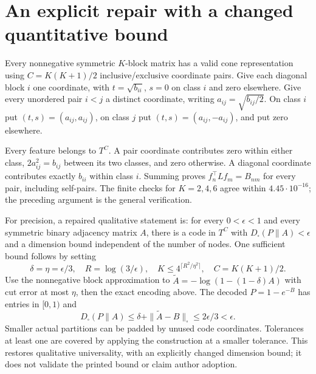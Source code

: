 \documentclass[10pt]{article}
\begin{document}
\section*{An explicit repair with a changed quantitative bound}
Every nonnegative symmetric \(K\)-block matrix has a valid cone representation using \(C=K(K+1)/2\) inclusive/exclusive coordinate pairs. Give each diagonal block \(i\) one coordinate, with \(t=\sqrt{b_{ii}}\), \(s=0\) on class \(i\) and zero elsewhere. Give every unordered pair \(i<j\) a distinct coordinate, writing \(a_{ij}=\sqrt{b_{ij}/2}\). On class \(i\) put \((t,s)=(a_{ij},a_{ij})\), on class \(j\) put \((t,s)=(a_{ij},-a_{ij})\), and put zero elsewhere.\par
Every feature belongs to \(T^C\). A pair coordinate contributes zero within either class, \(2a_{ij}^2=b_{ij}\) between its two classes, and zero otherwise. A diagonal coordinate contributes exactly \(b_{ii}\) within class \(i\). Summing proves \(f_n^\top Lf_m=B_{nm}\) for every pair, including self-pairs. The finite checks for \(K=2,4,6\) agree within \(4.45\cdot10^{-16}\); the preceding argument is the general verification.\par
For precision, a repaired qualitative statement is: for every \(0<\epsilon<1\) and every symmetric binary adjacency matrix \(A\), there is a code in \(T^C\) with \(D_\square(P\|A)<\epsilon\) and a dimension bound independent of the number of nodes. One sufficient bound follows by setting \[\delta=\eta=\epsilon/3,\quad R=\log(3/\epsilon),\quad
 K\le 4^{\lceil R^2/\eta^2\rceil},\quad C=K(K+1)/2.\] Use the nonnegative block approximation to \(\widetilde A=-\log(1-(1-\delta)A)\) with cut error at most \(\eta\), then the exact encoding above. The decoded \(P=1-e^{-B}\) has entries in \([0,1)\) and \[D_\square(P\|A)\le\delta+\|\widetilde A-B\|_\square
 \le 2\epsilon/3<\epsilon.\] Smaller actual partitions can be padded by unused code coordinates. Tolerances at least one are covered by applying the construction at a smaller tolerance. This restores qualitative universality, with an explicitly changed dimension bound; it does not validate the printed bound or claim author adoption.\par
\end{document}
